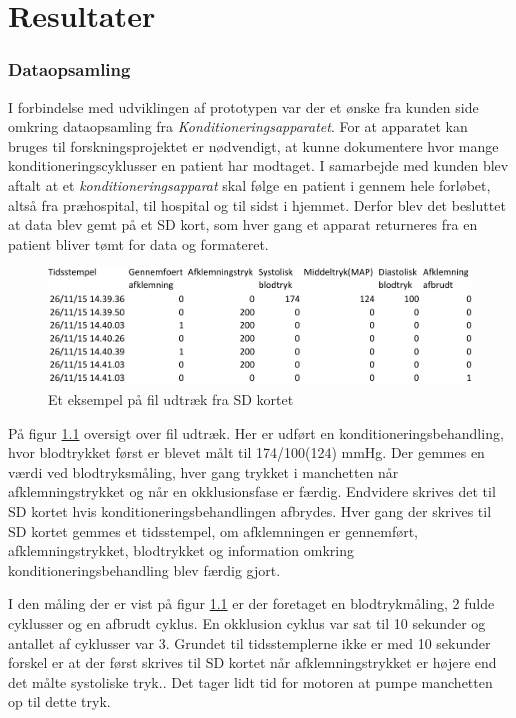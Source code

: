 \chapter{Resultater} \label{title:resultater}




\subsection{Dataopsamling}
I forbindelse med udviklingen af prototypen var der et ønske fra kunden side omkring dataopsamling fra \textit{Konditioneringsapparatet}. For at apparatet kan bruges til forskningsprojektet er nødvendigt, at kunne dokumentere hvor mange konditioneringscyklusser en patient har modtaget. I samarbejde med kunden blev aftalt at et \textit{konditioneringsapparat} skal følge en patient i gennem hele forløbet, altså fra præhospital, til hospital og til sidst i hjemmet. Derfor blev det besluttet at data blev gemt på et SD kort, som hver gang et apparat returneres fra en patient bliver tømt for data og formateret. 

\begin{figure}[H]
	\includegraphics[width = \textwidth]{billeder/fileksempel-crop.pdf}
	\caption{Et eksempel på fil udtræk fra SD kortet}\label{fig:fileksempel}
\end{figure}

På figur \ref{fig:fileksempel} oversigt over fil udtræk. Her er udført en konditioneringsbehandling, hvor blodtrykket først er blevet målt til 174/100(124) mmHg. Der gemmes en værdi ved blodtryksmåling, hver gang trykket i manchetten når afklemningstrykket og når en okklusionsfase er færdig. Endvidere skrives det til SD kortet hvis konditioneringsbehandlingen afbrydes. Hver gang der skrives til SD kortet gemmes et tidsstempel, om afklemningen er gennemført, afklemningstrykket, blodtrykket og information omkring konditioneringsbehandling blev færdig gjort. 

I den måling der er vist på figur \ref{fig:fileksempel} er der foretaget en blodtrykmåling, 2 fulde cyklusser og en afbrudt cyklus. En okklusion cyklus var sat til 10 sekunder og antallet af cyklusser var 3. Grundet til tidsstemplerne ikke er med 10 sekunder forskel er at der først skrives til SD kortet når afklemningstrykket er højere end det målte systoliske tryk.. Det tager lidt tid for motoren at pumpe manchetten op til dette tryk. 

